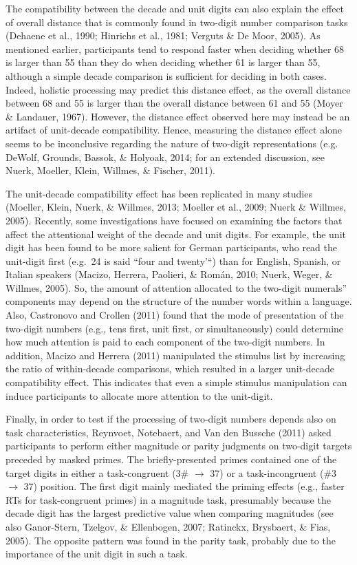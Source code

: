 \documentclass[english,man]{apa6}
\theoremstyle{definition}
\theoremstyle{definition}
\theoremstyle{definition}
\theoremstyle{remark}
\begin{document}
The compatibility between the decade and unit digits can also explain
the effect of overall distance that is commonly found in two-digit
number comparison tasks (Dehaene et al., 1990; Hinrichs et al., 1981;
Verguts \& De Moor, 2005). As mentioned earlier, participants tend to
respond faster when deciding whether 68 is larger than 55 than they do
when deciding whether 61 is larger than 55, although a simple decade
comparison is sufficient for deciding in both cases. Indeed, holistic
processing may predict this distance effect, as the overall distance
between 68 and 55 is larger than the overall distance between 61 and 55
(Moyer \& Landauer, 1967). However, the distance effect observed here
may instead be an artifact of unit-decade compatibility. Hence,
measuring the distance effect alone seems to be inconclusive regarding
the nature of two-digit representations (e.g. DeWolf, Grounds, Bassok,
\& Holyoak, 2014; for an extended discussion, see Nuerk, Moeller, Klein,
Willmes, \& Fischer, 2011).

The unit-decade compatibility effect has been replicated in many studies
(Moeller, Klein, Nuerk, \& Willmes, 2013; Moeller et al., 2009; Nuerk \&
Willmes, 2005). Recently, some investigations have focused on examining
the factors that affect the attentional weight of the decade and unit
digits. For example, the unit digit has been found to be more salient
for German participants, who read the unit-digit first (e.g.~24 is said
``four and twenty'\enquote{) than for English, Spanish, or Italian
speakers (Macizo, Herrera, Paolieri, \& Román, 2010; Nuerk, Weger, \&
Willmes, 2005). So, the amount of attention allocated to the two-digit
numerals} components may depend on the structure of the number words
within a language. Also, Castronovo and Crollen (2011) found that the
mode of presentation of the two-digit numbers (e.g., tens first, unit
first, or simultaneously) could determine how much attention is paid to
each component of the two-digit numbers. In addition, Macizo and Herrera
(2011) manipulated the stimulus list by increasing the ratio of
within-decade comparisons, which resulted in a larger unit-decade
compatibility effect. This indicates that even a simple stimulus
manipulation can induce participants to allocate more attention to the
unit-digit.

Finally, in order to test if the processing of two-digit numbers depends
also on task characteristics, Reynvoet, Notebaert, and Van den Bussche
(2011) asked participants to perform either magnitude or parity
judgments on two-digit targets preceded by masked primes. The
briefly-presented primes contained one of the target digits in either a
task-congruent (3\# \(\rightarrow\) 37) or a task-incongruent (\#3
\(\rightarrow\) 37) position. The first digit mainly mediated the
priming effects (e.g., faster RTs for task-congruent primes) in a
magnitude task, presumably because the decade digit has the largest
predictive value when comparing magnitudes (see also Ganor-Stern,
Tzelgov, \& Ellenbogen, 2007; Ratinckx, Brysbaert, \& Fias, 2005). The
opposite pattern was found in the parity task, probably due to the
importance of the unit digit in such a task.
\end{document}
